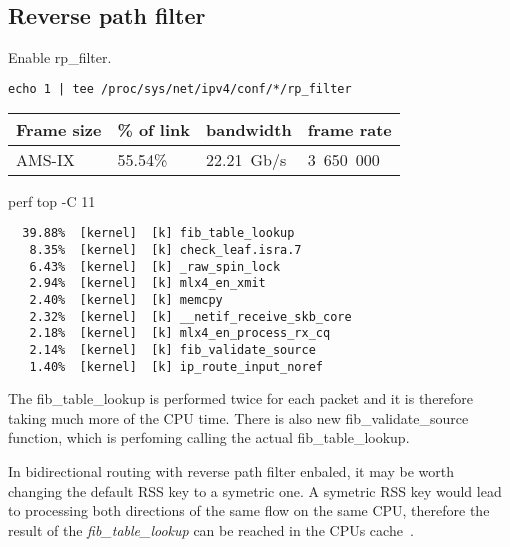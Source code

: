 
\subsection{Reverse path filter}
Enable rp\_filter.
\begin{lstlisting}[language=TeX]
echo 1 | tee /proc/sys/net/ipv4/conf/*/rp_filter
\end{lstlisting}

\begin{tabular}{ | l | l | l | l | }
\hline
Frame size & \% of link & bandwidth & frame rate \\
\hline
AMS-IX & 55.54\% & 22.21~Gb/s & 3~650~000 \\
\hline
\end{tabular}


perf top -C 11
\begin{lstlisting}
  39.88%  [kernel]  [k] fib_table_lookup
   8.35%  [kernel]  [k] check_leaf.isra.7
   6.43%  [kernel]  [k] _raw_spin_lock
   2.94%  [kernel]  [k] mlx4_en_xmit
   2.40%  [kernel]  [k] memcpy
   2.32%  [kernel]  [k] __netif_receive_skb_core
   2.18%  [kernel]  [k] mlx4_en_process_rx_cq
   2.14%  [kernel]  [k] fib_validate_source
   1.40%  [kernel]  [k] ip_route_input_noref
\end{lstlisting}
The fib\_table\_lookup is performed twice for each packet
and it is therefore taking much more of the CPU time.
There is also new fib\_validate\_source function, which is perfoming calling
the actual fib\_table\_lookup.

In bidirectional routing with reverse path filter enbaled,
it may be worth changing the default RSS key to a symetric one.
A symetric RSS key would lead to processing both directions of the same flow on the same CPU,
therefore the result of the {\it{fib\_table\_lookup}} can be reached in the CPUs cache~\cite{symetric-rss}.
